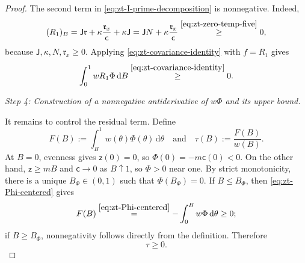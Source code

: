 \documentclass[10pt]{amsart}
\theoremstyle{definition}
\theoremstyle{remark}
\numberwithin{equation}{section}
\newcommand{\1}{\mathbf 1}
\newcommand{\dd}{\,\mathrm d}
\newcommand{\stackref}[2]{\stackrel{#2}{#1}}
\begin{document}
\begin{proof}
The second term in \eqref{eq:zt-I-prime-decomposition} is nonnegative. Indeed,
\begin{equation*}
 (R_1)_B=\mathsf J\mathfrak r+\kappa\frac{\mathfrak r_x}{\mathsf c}+\kappa \mathsf J
 =\mathsf J N+\kappa\frac{\mathfrak r_x}{\mathsf c}
 \stackref{\geq}{\eqref{eq:zt-zero-temp-five}}0,
\end{equation*}
because $\mathsf J,\kappa,N,\mathfrak r_x\geq0$.  Applying \eqref{eq:zt-covariance-identity} with $f=R_1$ gives
\begin{equation}
 \int_0^1wR_1\Phi\dd B
 \stackref{\geq}{\eqref{eq:zt-covariance-identity}}0.
 \label{eq:zt-R1-term-nonnegative}
\end{equation}

\smallskip
\noindent\emph{Step 4: Construction of a nonnegative antiderivative of $w\Phi$ and its upper bound.}

It remains to control the residual term. Define
\begin{equation}
 F(B):=\int_B^1w(\theta)\Phi(\theta)\dd\theta\quad\text{and}\quad
 \tau(B):=\frac{F(B)}{w(B)}.
 \label{eq:zt-F-tau-def}
\end{equation}
At $B=0$, evenness gives $\mathsf z(0)=0$, so $\Phi(0)=-m\mathsf c(0)<0$. On the other hand, $\mathsf z\geq mB$ and $\mathsf c\to0$ as $B\uparrow1$, so $\Phi>0$ near one. By strict monotonicity, there is a unique $B_\Phi\in(0,1)$ such that $\Phi(B_\Phi)=0$. If $B\leq B_\Phi$, then \eqref{eq:zt-Phi-centered} gives
\begin{equation*}
 F(B)
 \stackref{=}{\eqref{eq:zt-Phi-centered}}
 -\int_0^Bw\Phi\dd\theta\geq0;
\end{equation*}
if $B\geq B_\Phi$, nonnegativity follows directly from the definition. Therefore
\begin{equation}
 \tau\geq0.
 \label{eq:zt-tau-lower}
\end{equation}


\end{proof}
\end{document}
